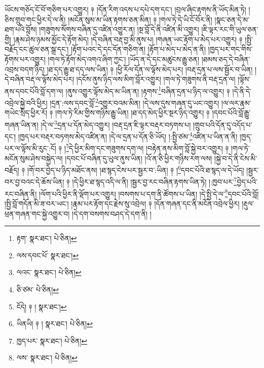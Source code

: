 ཡོངས་གཅོད་ངོ་བོ་གཅིག་པར་འགྱུར། ༈ །དོན་རིག་འདས་པ་དཔེ་དག་དང་། །བྲལ་ཞིང་རྟགས་ནི་ཡོད་མིན་ཏེ། །ཅིས་གྲུབ་གང་ཕྱིར་དེ་ལ་ནི། །མངོན་སུམ་མ་ཡིན་རྟགས་ཅན་མིན། ༈ །གལ་ཏེ་དེ་ཡི་ངོ་བོར་ནི། །སྣང་ཅན་དེ་མ་ཐག་པའི་བློས། །གཟུགས་སོགས་བཞིན་དུ་འཛིན་འགྱུར་ན། །སྔ་བློ་དེ་ནི་འཛིན་མི་འགྱུར། །ཇི་ལྟར་རང་གི་ཡུལ་ཅན་གྱི། །རྣམ་ཤེས་ཉམས་མྱོང་དེ་རྟོག་མེད། །དེ་བཞིན་བརྡ་བྱ་མི་ནུས་པ། །གཞན་ཡང་རྟོག་པ་མེད་པར་འགྱུར། ༈ །སྤྱི་བརྗོད་ངང་ཚུལ་ཅན་སྒྲ་དང་། །རྟོག་པའང་དེ་དང་དོན་གཅིག་ན། །རྟོག་པ་མེད་པ་མེད་ན་ནི། །ཁྱད་པར་གང་གིས་རྟོགས་པར་འགྱུར། །གལ་ཏེ་རྟོག་མེད་འགའ་ཞིག་ཀྱང་། །ཡོད་ན་དེ་དང་མཚུངས་རྒྱུ་ཅན། །ཐམས་ཅད་དེ་བཞིན་འབྲས་བདག་ཉིད། །ཐ་དད་རྒྱུ་ཐ་དད་ལས་ཡིན། ༈ །ཕྱི་རོལ་དོན་ལ་ལྟོས་མེད་པར། །བརྡ་དྲན་པ་ལས་སྦྱོར་བ་ཡིན། །དེ་བཞིན་བརྡ་ལ་ལྟོས་མེད་པར། །དངོས་ནུས་ཉིད་ལས་མིག་བློར་འགྱུར། །གལ་ཏེ་གཟུགས་ནི་བརྡ་དྲན་ལ། །ལྟོས་ནས་དབང་པོའི་བློ་དག་ལ། །ནུས་འགྱུར་ལྟོས་མེད་མ་ཡིན་ན། །རྟགས་\footnote{རྟག་  སྣར་ཐང་།  པེ་ཅིན། }བཞིན་དྲན་པ་ཉིད་ལ་འགྱུར། ༈ །དེ་ནི་དེ་འབྲེལ་སྐྱེ་བའི་ཕྱིར། །དྲན་:ལས་དབང་བློ་\footnote{ལས་དབང་པོ་  སྣར་ཐང་། }འགྱུར་བའམ་མིན། །དེ་ལས་དུས་གཞན་དུ་ཡང་འགྱུར། །ལ་ལར་རྣམ་གཡེང་སྲིད་ཕྱིར་རོ། ༈ །གལ་ཏེ་རིམ་གྱིས་གཉིས་རྒྱུ་ཡིན། །ཐ་དད་མེད་ཕྱིར་སྔར་ཉིད་འགྱུར། ༈ །དབང་པོའི་བློ་རྒྱུ་གཞན་ཡིན་ན། །དེ་ལ་\footnote{ལའང་  སྣར་ཐང་།  པེ་ཅིན། }དྲན་པ་དོན་མེད་འགྱུར། །བརྡ་དྲན་ཇི་ལྟར་བརྡར་བཏགས་པ། །གྲུབ་པའི་དོན་དུ་འདོད་པ་དང་། །ཁྱད་པར་བརྡར་བཏགས་མེད་འཛིན་ན། །དེ་ལ་དྲན་པ་དོན་ཅི་ཡོད། །:སྤྱི་ཙམ་\footnote{ཅི་ཙམ་  པེ་ཅིན། }འཛིན་པ་ཡིན་ན་ནི། །ཁྱད་པར་ལ་ལྟོས་མི་རུང་:ངོ། ༈ །\footnote{ངོདེ། ༈ །  སྣར་ཐང་། }དེ་ཕྱིར་མིག་དང་གཟུགས་དག་ལ། །བརྟེན་ནས་མིག་བློ་སྐྱེ་བར་འགྱུར། ༈ །གལ་ཏེ་མངོན་སུམ་ཤེས་བསྐྱེད་ལ། །དབང་པོ་བཞིན་དུ་ཡུལ་ནུས་ཡིན། །འོ་ན་ཅི་ཕྱིར་གཉིས་རག་ལས། །སྐྱེ་བ་དེ་ནི་ངེས་མི་བརྗོད། ༈ །གོ་བར་བྱེད་པ་ཉིད་མཐོང་ནས། །ཐ་སྙད་ངེས་པར་སྦྱར་བ་:ཡིན། ༈ །\footnote{ཡིནཡི། ༈ །  སྣར་ཐང་།  པེ་ཅིན། }དབང་པོའི་ཐ་སྙད་ལ་དེ་ཡོད། །སྦྱར་བར་བྱ་བའང་དེ་ཆོས་ཡིན། ༈ །དེ་ཕྱིར་ཐ་སྙད་འདི་ལ་ནི། །སྦྱར་བྱ་རང་བཞིན་རྟགས་ཡིན་ཏེ། །:ཁྱབ་པར་\footnote{ཁྱད་པར་  སྣར་ཐང་།  པེ་ཅིན། }བྱེད་པའི་རང་བཞིན་ནི། །ལོག་པའི་ཕྱིར་ནི་ལྡོག་པར་འགྱུར། །བསགས་པ་དག་ནི་ཚོགས་པ་ཡིན། །དེ་སྤྱི་དེ་ལ་\footnote{ལས་  སྣར་ཐང་།  པེ་ཅིན། }དབང་པོའི་བློ། །སྤྱི་བློ་གདོན་མི་ཟ་བར་ཡང་། །རྣམ་པར་རྟོག་དང་རྗེས་སུ་འབྲེལ། ༈ །དོན་གཞན་དང་ནི་མངོན་འབྲེལ་ཕྱིར། །རྡུལ་ཕྲན་གཞན་གང་སྐྱེ་འགྱུར་བ། །དེ་དག་བསགས་བཤད་དེ་དག་ནི། །
